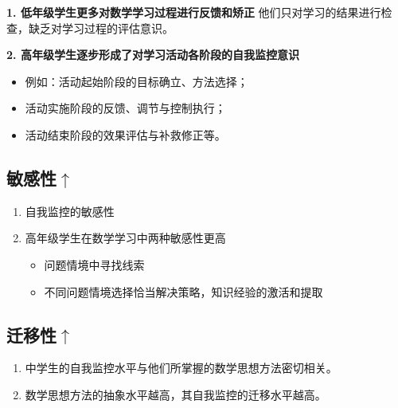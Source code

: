 \textbf{1. 低年级学生更多对数学学习过程进行反馈和矫正}
他们只对学习的结果进行检查，缺乏对学习过程的评估意识。

\textbf{2. 高年级学生逐步形成了对学习活动各阶段的自我监控意识}
\begin{itemize}
    \item 例如：活动起始阶段的目标确立、方法选择；
    \item 活动实施阶段的反馈、调节与控制执行；
    \item 活动结束阶段的效果评估与补救修正等。
\end{itemize}

\subsection*{敏感性$\uparrow$}

\begin{enumerate}
    \item 自我监控的敏感性
    \item 高年级学生在数学学习中两种敏感性更高
    \begin{itemize}
        \item 问题情境中寻找线索
        \item 不同问题情境选择恰当解决策略，知识经验的激活和提取
    \end{itemize}
\end{enumerate}

\subsection*{迁移性$\uparrow$}

\begin{enumerate}
    \item 中学生的自我监控水平与他们所掌握的数学思想方法密切相关。
    \item 数学思想方法的抽象水平越高，其自我监控的迁移水平越高。
\end{enumerate}